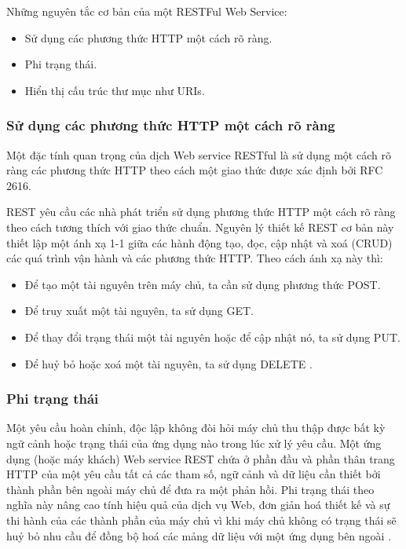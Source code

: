 \documentclass[12pt,a4paper,oneside]{extbook}
\begin{document}
Những nguyên tắc cơ bản của một RESTFul Web Service:

\begin{itemize}[topsep=1mm,itemsep=-0.5mm]
\item Sử dụng các phương thức HTTP một cách rõ ràng.
\item Phi trạng thái.
\item Hiển thị cấu trúc thư mục như URIs.
\vspace{1mm}
\end{itemize}

\subsubsection{Sử dụng các phương thức HTTP một cách rõ ràng}

Một đặc tính quan trọng của dịch Web service RESTful là sử dụng một cách rõ ràng các phương thức HTTP theo cách một giao thức được xác định bởi RFC 2616.

REST yêu cầu các nhà phát triển sử dụng phương thức HTTP một cách rõ ràng theo cách tương thích với giao thức chuẩn. Nguyên lý thiết kế REST cơ bản này thiết lập một ánh xạ 1-1 giữa các hành động tạo, đọc, cập nhật và xoá (CRUD) các quá trình vận hành và các phương thức HTTP. Theo cách ánh xạ này thì:

\begin{itemize}[topsep=1mm,itemsep=-0.5mm]
\item Để tạo một tài nguyên trên máy chủ, ta cần sử dụng phương thức POST.
\item Để truy xuất một tài nguyên, ta sử dụng GET.
\item Để thay đổi trạng thái một tài nguyên hoặc để cập nhật nó, ta sử dụng PUT.
\item Để huỷ bỏ hoặc xoá một tài nguyên, ta sử dụng DELETE \cite{restful-basic}.
\vspace{1mm}
\end{itemize}

\subsubsection{Phi trạng thái}

Một yêu cầu hoàn chỉnh, độc lập không đòi hỏi máy chủ thu thập được bất kỳ ngữ cảnh hoặc trạng thái của ứng dụng nào trong lúc xử lý yêu cầu. Một ứng dụng (hoặc máy khách) Web service REST chứa ở phần đầu và phần thân trang HTTP của một yêu cầu tất cả các tham số, ngữ cảnh và dữ liệu cần thiết bởi thành phần bên ngoài máy chủ để đưa ra một phản hồi. Phi trạng thái theo nghĩa này nâng cao tính hiệu quả của dịch vụ Web, đơn giản hoá thiết kế và sự thi hành của các thành phần của máy chủ vì khi máy chủ không có trạng thái sẽ huỷ bỏ nhu cầu để đồng bộ hoá các mảng dữ liệu với một ứng dụng bên ngoài \cite{restful-basic}.
\end{document}

